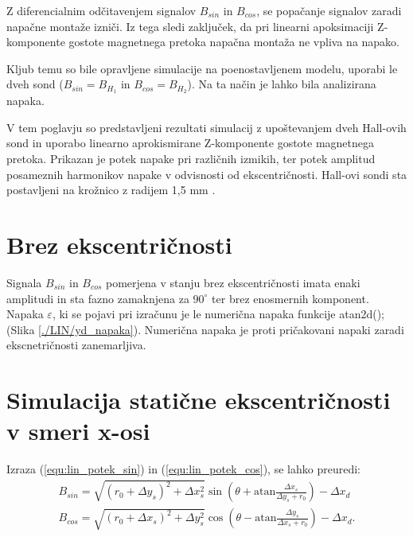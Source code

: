Z diferencialnim odčitavenjem signalov  $B_{sin}$ in $B_{cos}$, se popačanje signalov zaradi napačne montaže izniči. Iz tega sledi zaključek, da pri linearni apoksimaciji Z-komponente gostote magnetnega pretoka napačna montaža ne vpliva na napako.

Kljub temu so bile opravljene simulacije na poenostavljenem modelu, uporabi le dveh sond
 ($B_{sin}=B_{H_1}$ in $B_{cos}=B_{H_2}$). Na ta način je lahko bila analizirana napaka.

V tem poglavju so predstavljeni rezultati simulacij z upoštevanjem dveh Hall-ovih sond in uporabo linearno aprokismirane Z-komponente gostote magnetnega pretoka.
Prikazan je potek napake pri različnih izmikih, ter potek amplitud posameznih harmonikov napake v odvisnosti od ekscentričnosti.
Hall-ovi sondi sta postavljeni na krožnico z radijem 1,5 mm \cite{AM8192}.
\section{Brez ekscentričnosti}
Signala $B_{sin}$ in $B_{cos}$ pomerjena v stanju brez ekscentričnosti imata enaki amplitudi in sta fazno zamaknjena za $90^{\circ}$ ter brez enosmernih komponent. Napaka $\varepsilon$, ki se pojavi pri izračunu je le numerična napaka funkcije atan2d(); (Slika \ref{./LIN/yd_napaka}). Numerična napaka je proti pričakovani napaki zaradi ekscnetričnosti zanemarljiva.
\newpage
\section{Simulacija statične ekscentričnosti v smeri x-osi}
Izraza (\ref{equ:lin_potek_sin}) in (\ref{equ:lin_potek_cos}), se lahko preuredi:
\begin{eqnarray}
\label{equ:linearna_atan_sin}
B_{sin}= \sqrt{(r_0+\Delta y_s)^2+\Delta x_s^2} \sin(\theta+  \mathrm{ atan} \frac{\Delta x_s}{\Delta y_s +r_0})-\Delta x_d\\
\label{equ:linearna_atan_cos}
B_{cos}= \sqrt{(r_0+\Delta x_s)^2+\Delta y_s^2} \cos(\theta-  \mathrm{ atan} \frac{\Delta y_s}{\Delta x_s +r_0}) -\Delta x_d.
\end{eqnarray}

